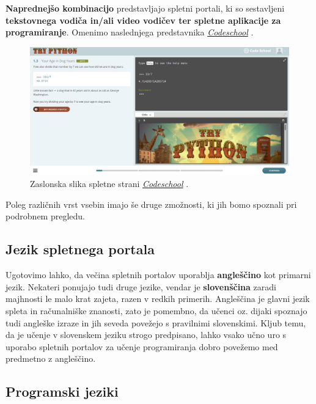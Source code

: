 \textbf{Naprednejšo kombinacijo} predstavljajo spletni portali, ki so
sestavljeni \textbf{tekstovnega vodiča in/ali video vodičev ter
  spletne aplikacije za programiranje}. Omenimo naslednjega
predstavnika \emph{\href{https://www.codeschool.com/}{Codeschool}}
\cite{web:codeschool}.

\begin{figure}[h!]
    \includegraphics [width=1\linewidth, keepaspectratio =
    1] {./images/sc_web/codeschool_01.png}
    \caption{Zaslonska slika spletne strani
      \emph{\href{https://www.codeschool.com/}{Codeschool}}
      \cite{web:codeschool}.}
    \label{fig:scr:web:codeschool}
\end{figure}

Poleg različnih vrst vsebin imajo še druge zmožnosti, ki jih bomo
spoznali pri podrobnem pregledu.

\subsection{Jezik spletnega portala}
\label{sec:jezik_spletnega_portala}

Ugotovimo lahko, da večina spletnih portalov uporablja
\textbf{angleščino} kot primarni jezik. Nekateri ponujajo tudi druge
jezike, vendar je \textbf{slovenščina} zaradi majhnosti le malo krat
zajeta, razen v redkih primerih. Angleščina je glavni jezik spleta in
računalniške znanosti, zato je pomembno, da učenci oz. dijaki spoznajo
tudi angleške izraze in jih seveda povežejo s pravilnimi
slovenskimi. Kljub temu, da je učenje v slovenskem jeziku strogo
predpisano, lahko vsako učno uro s uporabo spletnih portalov za učenje
programiranja dobro povežemo med predmetno z angleščino.


\subsection{Programski jeziki}
\label{sec:_zanaja_programski_jeziki}

